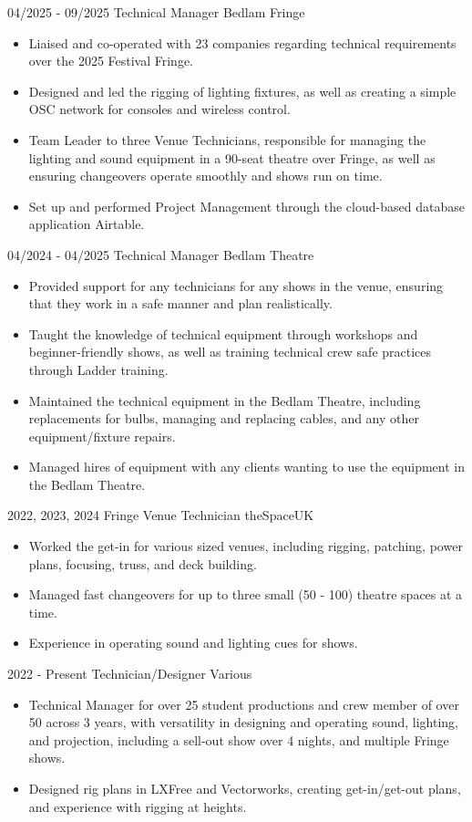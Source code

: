\documentclass[../../cv-tech.tex]{subfiles}
\begin{document}
\cvevent
{04/2025 - 09/2025}
	{Technical Manager}
	{Bedlam Fringe}
	{\begin{itemize}
	    \item Liaised and co-operated with 23 companies regarding technical requirements over the 2025 Festival Fringe.
		\item Designed and led the rigging of lighting fixtures, as well as creating a simple OSC network for consoles and wireless control.
		\item Team Leader to three Venue Technicians, responsible for managing the lighting and sound equipment in a 90-seat theatre over Fringe, as well as ensuring changeovers operate smoothly and shows run on time.
		\item Set up and performed Project Management through the cloud-based database application Airtable.
	\end{itemize}
}
\vfill\null

\cvevent
{04/2024 - 04/2025}
	{Technical Manager}
	{Bedlam Theatre}
	{\begin{itemize}
			\item Provided support for any technicians for any shows in the venue, ensuring that they work in a safe manner and plan realistically. 
			\item Taught the knowledge of technical equipment through workshops and beginner-friendly shows, as well as training technical crew safe practices through Ladder training. 
			\item Maintained the technical equipment in the Bedlam Theatre, including replacements for bulbs, managing and replacing cables, and any other equipment/fixture repairs. 
			\item Managed hires of equipment with any clients wanting to use the equipment in the Bedlam Theatre. 
	\end{itemize}
}
\vfill\null

\cvevent
{2022, 2023, 2024}
	{Fringe Venue Technician}
	{theSpaceUK}
	{\begin{itemize}
			\item Worked the get-in for various sized venues, including rigging, patching, power plans, focusing, truss, and deck building. 
			\item Managed fast changeovers for up to three small (50 - 100) theatre spaces at a time. 
			\item Experience in operating sound and lighting cues for shows. 
	\end{itemize}
}
\vfill\null

\cvevent
{2022 - Present}
	{Technician/Designer}
	{Various}
	{\begin{itemize}
			\item Technical Manager for over 25 student productions and crew member of over 50 across 3 years, with versatility in designing and operating sound, lighting, and projection, including a sell-out show over 4 nights, and multiple Fringe shows.
			\item Designed rig plans in LXFree and Vectorworks, creating get-in/get-out plans, and experience with rigging at heights. 
	\end{itemize}
}

\vfill\null
\end{document}
